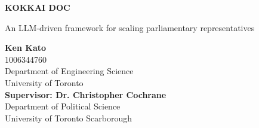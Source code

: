\begin{titlepage}
    \begin{center}
        \vspace*{1cm}
            
        \Huge
        \textbf{KOKKAI DOC}
            
        \vspace{0.5cm}
        \LARGE
        An LLM-driven framework for scaling parliamentary representatives
            
        \vspace{1.5cm}
            
        \textbf{Ken Kato}\\
        \Large
        1006344760\\
        Department of Engineering Science\\
        University of Toronto\\
        \vspace{1.5cm}
        \LARGE
        \textbf{Supervisor: Dr. Christopher Cochrane}\\
        \Large
        Department of Political Science\\
        University of Toronto Scarborough\\        
            
    \end{center}
\end{titlepage}
